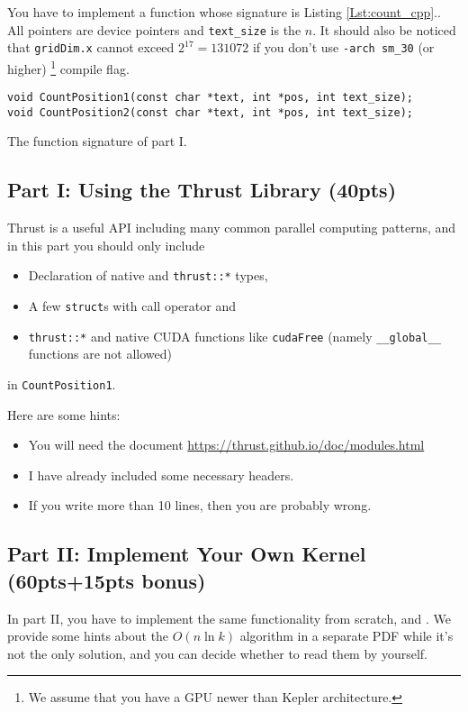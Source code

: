 \documentclass[12pt,a4paper]{article}
\renewcommand{\_}{\textscale{.5}{\textunderscore}}
\newcommand{\lstref}[1]{Listing \ref{Lst:#1}.}
\begin{document}
You have to implement a function whose signature is \lstref{count_cpp}.
All pointers are device pointers and \verb+text_size+ is the $n$.
It should also be noticed that \verb+gridDim.x+ cannot exceed $2^{17}=131072$
if you don't use \verb|-arch sm_30| (or higher)
\footnote{We assume that you have a GPU newer than Kepler architecture.} compile flag.

\begin{listing}[ht]
\begin{verbatim}
void CountPosition1(const char *text, int *pos, int text_size);
void CountPosition2(const char *text, int *pos, int text_size);
\end{verbatim}
\caption{The function signature of part I.}\label{Lst:count_cpp}
\end{listing}

\subsection{Part I: Using the Thrust Library (40pts)}\label{thrust}

Thrust is a useful API including many common parallel computing patterns,
and in this part you should only include
\begin{itemize}
\item Declaration of native and \verb+thrust::*+ types,
\item A few \verb+struct+s with call operator and
\item \verb+thrust::*+ and native CUDA functions like \verb+cudaFree+
      (namely \verb+__global__+ functions are not allowed)
\end{itemize}
in \verb+CountPosition1+.

Here are some hints:
\begin{itemize}
\item You will need the document \url{https://thrust.github.io/doc/modules.html}
\item I have already included some necessary headers.
\item If you write more than 10 lines, then you are probably wrong.
\end{itemize}

\subsection{Part II: Implement Your Own Kernel (60pts+15pts bonus)}

In part II, you have to implement the same functionality from scratch,
and {\color{red}{no external API and library is allowed}}.
We provide some hints about the $O(n\ln k)$ algorithm in a separate PDF
while it's not the only solution,
and you can decide whether to read them by yourself.
\end{document}
